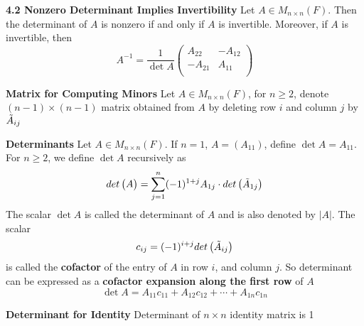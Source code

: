 \documentclass[11pt]{article}
\begin{document}
\begin{theorem*}
    \textbf{4.2 Nonzero Determinant Implies Invertibility} Let $A\in M_{n\times n}(F)$. Then the determinant of $A$ is nonzero if and only if $A$ is invertible. Moreover, if $A$ is invertible, then 
    \[
        A^{-1} = \frac{1}{\det{A}} 
        \begin{pmatrix}
            A_{22} & -A_{12} \\
            -A_{21} & A_{11} \\ 
        \end{pmatrix}
    \]
\end{theorem*}


\begin{defn*}
    \textbf{Matrix for Computing Minors} Let $A\in M_{n\times n}(F)$, for $n\geq 2$, denote $(n-1)\times (n-1)$ matrix obtained from $A$ by deleting row $i$ and column $j$ by $\tilde{A}_{ij}$
\end{defn*}


\begin{defn*}
    \textbf{Determinants} Let $A\in M_{n\times n}(F)$. If $n=1$, $A=(A_{11})$, define $\det{A} = A_{11}$. For $n\geq 2$, we define $\det{A}$ recursively as 
    \[
        det\begin{pmatrix}A\end{pmatrix} = \sum_{j=1}^n (-1)^{1+j} A_{1j} \cdot det\begin{pmatrix}\tilde{A}_{1j}\end{pmatrix}
    \]
    The scalar $\det{A}$ is called the determinant of $A$ and is also denoted by $|A|$. The scalar 
    \[
        c_{ij} = (-1)^{i+j} det\begin{pmatrix}\tilde{A}_{ij}\end{pmatrix}    
    \]
    is called the \textbf{cofactor} of the entry of $A$ in row $i$, and column $j$. So determinant can be expressed as a \textbf{cofactor expansion along the first row} of $A$
    \[
        \det{A} = A_{11}c_{11} + A_{12}c_{12} + \cdots + A_{1n}c_{1n}
    \]
\end{defn*}


\begin{defn*}
    \textbf{Determinant for Identity} Determinant of $n\times n$ identity matrix is 1
\end{defn*}
\end{document}

